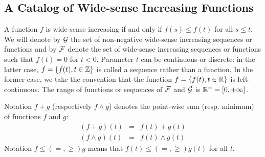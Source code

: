 \subsection{A Catalog of Wide-sense Increasing Functions}
A function $f$ is wide-sense increasing if and only if $f(s) \leq
f(t)$ for all $s \leq t$. We will denote by $\mathcal G$ the set of
non-negative wide-sense increasing sequences or functions and by
$\mathcal F$ denote the set of  wide-sense increasing sequences or
functions such that $f(t) = 0$ for $t < 0$. Parameter $t$ can be
continuous or discrete: in the latter case, $f = \{ f(t), t \in
\mathbb{Z} \}$ is called a sequence rather than a function. In the
former case, we take the convention that the function $f = \{
f(t), t \in \mathbb{R} \}$ is left-continuous. The range of functions
or sequences of $\mathcal F$ and $\mathcal G$ is $\mathbb{R}^{+} = [0,+\infty]
$.

Notation $f + g$ (respectively $f \wedge g$) denotes the point-wise sum (resp. minimum) of
functions $f$ and $g$:
\begin{eqnarray*}
(f + g)(t) & = & f(t) + g(t) \\
(f \wedge g)(t) & = & f(t) \wedge g(t)
\end{eqnarray*}
Notation $f \leq (=, \geq) g$ means that $f(t) \leq (=, \geq) g(t)$ for all $t$.

